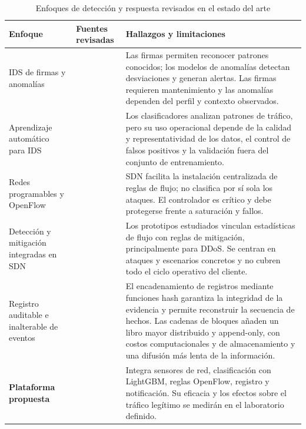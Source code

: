 \begin{table}[!htbp]
\centering
\footnotesize
\renewcommand{\arraystretch}{1.2}
\setlength{\tabcolsep}{4pt}
\caption{{\fontsize{11pt}{13}\selectfont Enfoques de detecci\'on y respuesta revisados en el estado del arte}}
\label{tbl:estadoArte}
\begin{tabular}{@{}>{\RaggedRight\arraybackslash}p{2.8cm}>{\RaggedRight\arraybackslash}p{4.2cm}>{\RaggedRight\arraybackslash}p{8.1cm}@{}}
\toprule
\textbf{Enfoque} & \textbf{Fuentes revisadas} & \textbf{Hallazgos y limitaciones} \\
\midrule
IDS de firmas y anomal\'ias & \parencite{denning1987,paxson1999,garciateodoro2009,nist80094} & Las firmas permiten reconocer patrones conocidos; los modelos de anomal\'ias detectan desviaciones y generan alertas. Las firmas requieren mantenimiento y las anomal\'ias dependen del perfil y contexto observados. \\
Aprendizaje autom\'atico para IDS & \parencite{buczak2016,sommer2010,khraisat2019,moustafa2015} & Los clasificadores analizan patrones de tr\'afico, pero su uso operacional depende de la calidad y representatividad de los datos, el control de falsos positivos y la validaci\'on fuera del conjunto de entrenamiento. \\
Redes programables y OpenFlow & \parencite{mckeown2008openflow,kreutz2015,scotthayward2016,openvswitch2015,berde2014onos,bondkovskii2016,khattak2014odl} & SDN facilita la instalaci\'on centralizada de reglas de flujo; no clasifica por s\'i sola los ataques. El controlador es cr\'itico y debe protegerse frente a saturaci\'on y fallos. \\
Detecci\'on y mitigaci\'on integradas en SDN & \parencite{braga2010,shin2013,kubo2014ryu,ryudocs} & Los prototipos estudiados vinculan estad\'isticas de flujo con reglas de mitigaci\'on, principalmente para DDoS. Se centran en ataques y escenarios concretos y no cubren todo el ciclo operativo del cliente. \\
Registro auditable e inalterable de eventos & \parencite{nakamoto2008} & El encadenamiento de registros mediante funciones hash garantiza la integridad de la evidencia y permite reconstruir la secuencia de hechos. Las cadenas de bloques a\~naden un libro mayor distribuido y append-only, con costos computacionales y de almacenamiento y una difusi\'on m\'as lenta de la informaci\'on. \\
\textbf{Plataforma propuesta} & \parencite{lightgbm2017,mckeown2008openflow,openvswitch2015} & Integra sensores de red, clasificaci\'on con LightGBM, reglas OpenFlow, registro y notificaci\'on. Su eficacia y los efectos sobre el tr\'afico leg\'itimo se medir\'an en el laboratorio definido. \\
\bottomrule
\end{tabular}
\end{table}


